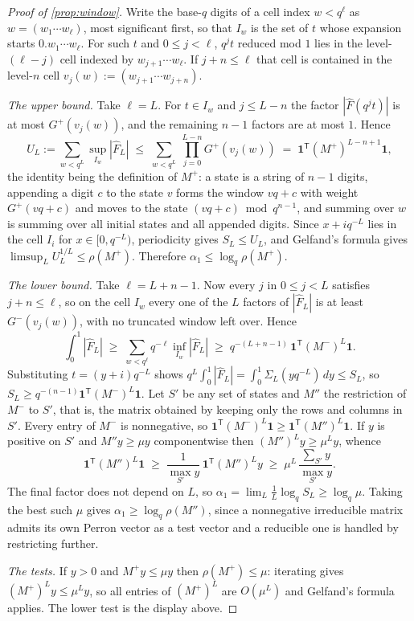 \documentclass[11pt]{amsart}
\theoremstyle{definition}
\theoremstyle{remark}
\begin{document}
\begin{proof}[Proof of \cref{prop:window}]
Write the base-$q$ digits of a cell index $w < q^{\ell}$ as $w = (w_{1}\cdots w_{\ell})$, most significant first, so that $I_{w}$ is the set of $t$ whose expansion starts $0.w_{1}\cdots w_{\ell}$. For such $t$ and $0 \le j < \ell$, $q^{j}t$ reduced mod $1$ lies in the level-$(\ell-j)$ cell indexed by $w_{j+1}\cdots w_{\ell}$. If $j + n \le \ell$ that cell is contained in the level-$n$ cell $v_{j}(w) := (w_{j+1}\cdots w_{j+n})$.

\emph{The upper bound.} Take $\ell = L$. For $t \in I_{w}$ and $j \le L-n$ the factor $|\widehat{F}(q^{j}t)|$ is at most $G^{+}(v_{j}(w))$, and the remaining $n-1$ factors are at most $1$. Hence
\[
  U_{L} := \sum_{w<q^{L}} \sup_{I_{w}}|\widehat{F}_{L}| \;\le\; \sum_{w<q^{L}}\ \prod_{j=0}^{L-n} G^{+}(v_{j}(w)) \;=\; \mathbf{1}^{\mathsf{T}}(M^{+})^{L-n+1}\mathbf{1},
\]
the identity being the definition of $M^{+}$: a state is a string of $n-1$ digits, appending a digit $c$ to the state $v$ forms the window $vq+c$ with weight $G^{+}(vq+c)$ and moves to the state $(vq+c) \bmod q^{n-1}$, and summing over $w$ is summing over all initial states and all appended digits. Since $x + iq^{-L}$ lies in the cell $I_{i}$ for $x \in [0, q^{-L})$, periodicity gives $S_{L} \le U_{L}$, and Gelfand's formula gives $\limsup_{L} U_{L}^{1/L} \le \rho(M^{+})$. Therefore $\alpha_{1} \le \log_{q}\rho(M^{+})$.

\emph{The lower bound.} Take $\ell = L + n - 1$. Now every $j$ in $0 \le j < L$ satisfies $j + n \le \ell$, so on the cell $I_{w}$ every one of the $L$ factors of $|\widehat{F}_{L}|$ is at least $G^{-}(v_{j}(w))$, with no truncated window left over. Hence
\[
  \int_{0}^{1}|\widehat{F}_{L}| \;\ge\; \sum_{w < q^{\ell}} q^{-\ell}\inf_{I_{w}}|\widehat{F}_{L}| \;\ge\; q^{-(L+n-1)}\, \mathbf{1}^{\mathsf{T}}(M^{-})^{L}\mathbf{1}.
\]
Substituting $t = (y+i)q^{-L}$ shows $q^{L}\int_{0}^{1}|\widehat{F}_{L}| = \int_{0}^{1}\Sigma_{L}(y q^{-L})\,dy \le S_{L}$, so $S_{L} \ge q^{-(n-1)}\mathbf{1}^{\mathsf{T}}(M^{-})^{L}\mathbf{1}$. Let $S'$ be any set of states and $M''$ the restriction of $M^{-}$ to $S'$, that is, the matrix obtained by keeping only the rows and columns in $S'$. Every entry of $M^{-}$ is nonnegative, so $\mathbf{1}^{\mathsf{T}}(M^{-})^{L}\mathbf{1} \ge \mathbf{1}^{\mathsf{T}}(M'')^{L}\mathbf{1}$. If $y$ is positive on $S'$ and $M''y \ge \mu y$ componentwise then $(M'')^{L}y \ge \mu^{L}y$, whence
\[
  \mathbf{1}^{\mathsf{T}}(M'')^{L}\mathbf{1} \;\ge\; \frac{1}{\max_{S'} y}\,\mathbf{1}^{\mathsf{T}}(M'')^{L}y \;\ge\; \mu^{L}\,\frac{\sum_{S'}y}{\max_{S'}y}.
\]
The final factor does not depend on $L$, so $\alpha_{1} = \lim_{L}\frac{1}{L}\log_{q}S_{L} \ge \log_{q}\mu$. Taking the best such $\mu$ gives $\alpha_{1} \ge \log_{q}\rho(M'')$, since a nonnegative irreducible matrix admits its own Perron vector as a test vector and a reducible one is handled by restricting further.

\emph{The tests.} If $y > 0$ and $M^{+}y \le \mu y$ then $\rho(M^{+}) \le \mu$: iterating gives $(M^{+})^{L}y \le \mu^{L}y$, so all entries of $(M^{+})^{L}$ are $O(\mu^{L})$ and Gelfand's formula applies. The lower test is the display above.
\end{proof}
\end{document}
